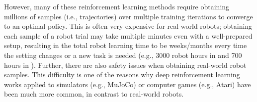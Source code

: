 \documentclass[letterpaper, 10 pt, conference]{ieeeconf}
\begin{document}
However, many of these reinforcement learning methods require obtaining millions of samples (i.e., trajectories) over multiple training iterations to converge to an optimal policy. 
This is often very expensive for real-world robots; obtaining each sample of a robot trial may take multiple minutes even with a well-prepared setup, resulting in the total robot learning time to be weeks/months every time the setting changes or a new task is needed (e.g., 3000 robot hours in \cite{levine2016learning} and 700 hours in \cite{pinto2016supersizing}). Further, there are also safety issues when obtaining real-world robot samples. This difficulty is one of the reasons why deep reinforcement learning works applied to simulators (e.g., MuJoCo) or computer games (e.g., Atari) have been much more common, in contrast to real-world robots.




\end{document}
